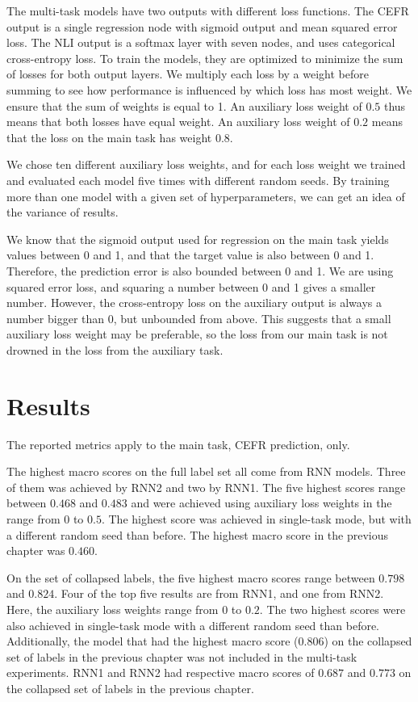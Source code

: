 The multi-task models have two outputs with different loss functions. The
CEFR output is a single regression node with sigmoid output and mean squared
error loss. The NLI output is a softmax layer with seven nodes, and uses
categorical cross-entropy loss. To train the models, they are optimized to
minimize the sum of losses for both output layers. We multiply each loss by a
weight before summing to see how performance is influenced by which loss has
most weight. We ensure that the sum of weights is equal to 1. An auxiliary
loss weight of $0.5$ thus means that both losses have equal weight. An
auxiliary loss weight of $0.2$ means that the loss on the main task has
weight $0.8$.

We chose ten different auxiliary loss weights, and for each loss weight we
trained and evaluated each model five times with different random seeds. By
training more than one model with a given set of hyperparameters, we can get
an idea of the variance of results.

We know that the sigmoid output used for regression on the main task yields
values between 0 and 1, and that the target value is also between 0 and 1.
Therefore, the prediction error is also bounded between 0 and 1. We are using
squared error loss, and squaring a number between 0 and 1 gives a smaller
number. However, the cross-entropy loss on the auxiliary output is always a
number bigger than 0, but unbounded from above. This suggests that a small
auxiliary loss weight may be preferable, so the loss from our main task is
not drowned in the loss from the auxiliary task.


\section{Results}

The reported metrics apply to the main task, CEFR prediction, only.

The highest macro \FI scores on the full label set all come from RNN models.
Three of them was achieved by RNN2 and two by RNN1. The five highest scores
range between $0.468$ and $0.483$ and were achieved using auxiliary loss
weights in the range from $0$ to $0.5$. The highest score was achieved in
single-task mode, but with a different random seed than before. The highest
macro \FI score in the previous chapter was $0.460$.

On the set of collapsed labels, the five highest macro \FI scores range
between $0.798$ and $0.824$. Four of the top five results are from RNN1, and
one from RNN2. Here, the auxiliary loss weights range from $0$ to $0.2$. The
two highest scores were also achieved in single-task mode with a different
random seed than before. Additionally, the model that had the highest macro
\FI score ($0.806$) on the collapsed set of labels in the previous chapter
was not included in the multi-task experiments. RNN1 and RNN2 had respective
macro \FI scores of $0.687$ and $0.773$ on the collapsed set of labels in the
previous chapter.

